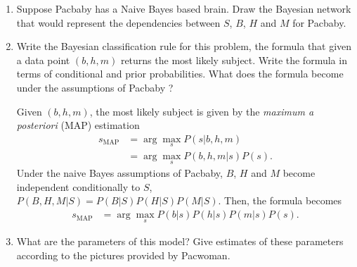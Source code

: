 \documentclass[11pt, a4paper]{article}
\begin{document}
\begin{enumerate}
    \item Suppose Pacbaby has a Naive Bayes based brain. Draw the Bayesian network that would represent the dependencies between $S$, $B$, $H$ and $M$ for Pacbaby.

    \begin{solution}
        \begin{figure}[H]
            \centering
        \end{figure}
    \end{solution}

    \item Write the Bayesian classification rule for this problem, \ie{} the formula that given a data point $(b, h, m)$ returns the most likely subject. Write the formula in terms of conditional and prior probabilities. What does the formula become under the assumptions of Pacbaby ?

    \begin{solution}
        Given $(b, h, m)$, the most likely subject is given by the \emph{maximum a posteriori} (MAP) estimation
        \begin{align*}
            s_{\text{MAP}} & = \arg\max_{s} P(s | b, h, m) \\
            & = \arg\max_{s} P(b, h, m | s) P(s) .
        \end{align*}
        Under the naive Bayes assumptions of Pacbaby, $B$, $H$ and $M$ become independent conditionally to $S$, \ie{} $P(B, H, M | S) = P(B | S) P(H | S) P(M | S)$. Then, the formula becomes
        \begin{align*}
            s_{\text{MAP}} & = \arg\max_{s} P(b | s) P(h | s) P(m | s) P(s) .
        \end{align*}
    \end{solution}

    \item What are the parameters of this model? Give estimates of these parameters according to the pictures provided by Pacwoman.


\end{enumerate}
\end{document}
